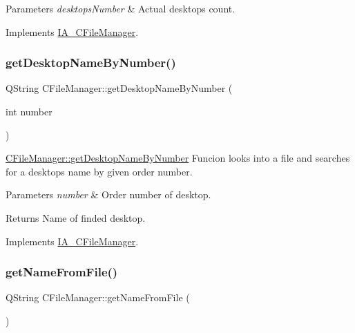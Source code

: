 \begin{DoxyParams}{Parameters}
{\em desktops\+Number} & Actual desktops count. \\
\hline
\end{DoxyParams}


Implements \hyperlink{classIA__CFileManager}{I\+A\+\_\+\+C\+File\+Manager}.

\mbox{\label{classCFileManager_a1c091b725f7040679f7d71de748a2335}} 
\subsubsection{\texorpdfstring{get\+Desktop\+Name\+By\+Number()}{getDesktopNameByNumber()}}
{\footnotesize\ttfamily Q\+String C\+File\+Manager\+::get\+Desktop\+Name\+By\+Number (\begin{DoxyParamCaption}\item[{int}]{number }\end{DoxyParamCaption})\hspace{0.3cm}{\ttfamily [virtual]}}



\hyperlink{classCFileManager_a1c091b725f7040679f7d71de748a2335}{C\+File\+Manager\+::get\+Desktop\+Name\+By\+Number} Funcion looks into a file and searches for a desktop\textquotesingle{}s name by given order number. 


\begin{DoxyParams}{Parameters}
{\em number} & Order number of desktop. \\
\hline
\end{DoxyParams}
\begin{DoxyReturn}{Returns}
Name of finded desktop. 
\end{DoxyReturn}


Implements \hyperlink{classIA__CFileManager}{I\+A\+\_\+\+C\+File\+Manager}.

\mbox{\label{classCFileManager_afe80a483037c156eaa4fd6ee7fb51b29}} 
\subsubsection{\texorpdfstring{get\+Name\+From\+File()}{getNameFromFile()}}
{\footnotesize\ttfamily Q\+String C\+File\+Manager\+::get\+Name\+From\+File (\begin{DoxyParamCaption}{ }\end{DoxyParamCaption})\hspace{0.3cm}{\ttfamily [virtual]}}



